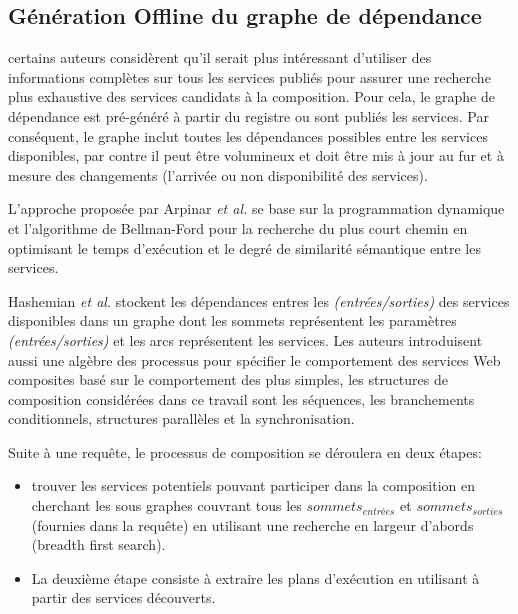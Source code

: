   \subsection{Génération Offline du graphe de dépendance}
  \label{sec:gener-offline}
  \begin{text}
    certains auteurs considèrent qu'il serait plus intéressant
    d'utiliser des informations complètes sur tous les services
    publiés pour assurer une recherche plus exhaustive des services
    candidats à la composition. Pour cela, le graphe de dépendance
    est pré-généré à partir du registre ou sont publiés les
    services. Par conséquent, le graphe inclut toutes les dépendances
    possibles entre les services disponibles, par contre il peut être
    volumineux et doit être mis à jour au fur et à mesure des
    changements (l'arrivée ou non disponibilité des services).
  \end{text}

  \begin{text}
    L'approche proposée par Arpinar \textit{et al.}
    \cite{arpinar2005ontology} se base sur la programmation dynamique
    et l'algorithme de Bellman-Ford pour la recherche du plus court
    chemin en optimisant le temps d'exécution et le degré de
    similarité sémantique entre les services.
  \end{text}

  \begin{text}
    Hashemian \textit{et al.} \cite{hashemian2006graph} stockent les
    dépendances entres les \textit{(entrées/sorties)} des services
    disponibles dans un graphe dont les sommets représentent les
    paramètres \textit{(entrées/sorties)} et les arcs représentent les
    services. Les auteurs introduisent aussi une algèbre des processus
    pour spécifier le comportement des services Web composites basé
    sur le comportement des plus simples, les structures de
    composition considérées dans ce travail sont les séquences, les
    branchements conditionnels, structures parallèles et la
    synchronisation.

    Suite à une requête, le processus de composition se déroulera en
    deux étapes:

    \begin{itemize}
    \item trouver les services potentiels pouvant participer dans la
      composition en cherchant les sous graphes couvrant tous les
      $sommets_{entrées}$ et $sommets_{sorties}$ (fournies dans la
      requête) en utilisant une recherche en largeur d'abords (breadth
      first search).

    \item La deuxième étape consiste à extraire les plans d'exécution
      en utilisant à partir des services découverts.
    \end{itemize}
  \end{text}

